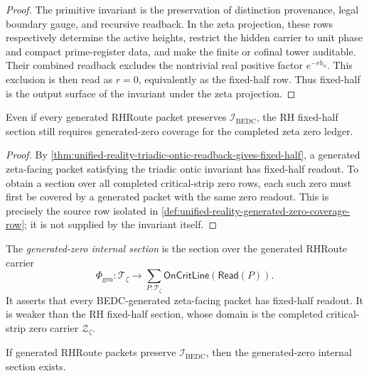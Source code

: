 \begin{proof}
The primitive invariant is the preservation of distinction provenance,
legal boundary gauge, and recursive readback.  In the zeta projection,
these rows respectively determine the active heights, restrict the
hidden carrier to unit phase and compact prime-register data, and make
the finite or cofinal tower auditable.  Their combined readback excludes
the nontrivial real positive factor $e^{-r h_a}$.  This exclusion is
then read as $r=0$, equivalently as the fixed-half row.  Thus fixed-half
is the output surface of the invariant under the zeta projection.
\end{proof}

\begin{corollary}
\label{cor:unified-reality-triadic-invariant-coverage-remains-missing}
Even if every generated RHRoute packet preserves
$\mathcal I_{\mathrm{BEDC}}$, the RH fixed-half section still requires
generated-zero coverage for the completed zeta zero ledger.
\end{corollary}

\begin{proof}
By
\autoref{thm:unified-reality-triadic-ontic-readback-gives-fixed-half},
a generated zeta-facing packet satisfying the triadic ontic invariant
has fixed-half readout.  To obtain a section over all completed
critical-strip zero rows, each such zero must first be covered by a
generated packet with the same zero readout.  This is precisely the
source row isolated in
\autoref{def:unified-reality-generated-zero-coverage-row}; it is not
supplied by the invariant itself.
\end{proof}

\begin{definition}
\label{def:unified-reality-generated-zero-internal-section}
The \emph{generated-zero internal section} is the section over the
generated RHRoute carrier
$$
\Phi_{\mathrm{gen}}:
\mathcal T_{\zeta}
\to
\sum_{P:\mathcal T_{\zeta}}\mathsf{OnCritLine}(\mathsf{Read}(P)).
$$
It asserts that every BEDC-generated zeta-facing packet has fixed-half
readout.  It is weaker than the RH fixed-half section, whose domain is
the completed critical-strip zero carrier $\mathcal Z_{\zeta}$.
\end{definition}

\begin{theorem}
\label{thm:unified-reality-triadic-closure-only-generated-section}
If generated RHRoute packets preserve
$\mathcal I_{\mathrm{BEDC}}$, then the generated-zero internal section
exists.
\end{theorem}

